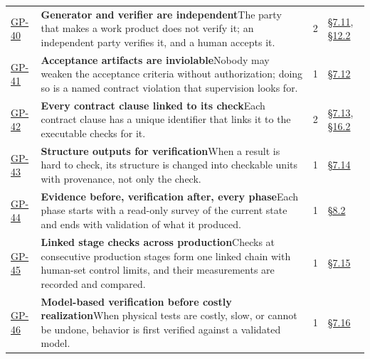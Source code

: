 \begin{longtable}{@{}p{} p{} r p{}@{}}
\hyperlink{gp-40}{GP-40}\hypertarget{gp-40}{} & \textbf{Generator and verifier are independent}\newline The party that makes a work product does not verify it; an independent party verifies it, and a human accepts it.\rule[-\normalbaselineskip]{0pt}{0pt} & 2 & \hyperlink{nss-7.11}{\S7.11}, \hyperlink{nss-12.2}{\S12.2}\rule[-\normalbaselineskip]{0pt}{0pt} \\
\hyperlink{gp-41}{GP-41}\hypertarget{gp-41}{} & \textbf{Acceptance artifacts are inviolable}\newline Nobody may weaken the acceptance criteria without authorization; doing so is a named contract violation that supervision looks for.\rule[-\normalbaselineskip]{0pt}{0pt} & 1 & \hyperlink{nss-7.12}{\S7.12}\rule[-\normalbaselineskip]{0pt}{0pt} \\
\hyperlink{gp-42}{GP-42}\hypertarget{gp-42}{} & \textbf{Every contract clause linked to its check}\newline Each contract clause has a unique identifier that links it to the executable checks for it.\rule[-\normalbaselineskip]{0pt}{0pt} & 2 & \hyperlink{nss-7.13}{\S7.13}, \hyperlink{nss-16.2}{\S16.2}\rule[-\normalbaselineskip]{0pt}{0pt} \\
\hyperlink{gp-43}{GP-43}\hypertarget{gp-43}{} & \textbf{Structure outputs for verification}\newline When a result is hard to check, its structure is changed into checkable units with provenance, not only the check.\rule[-\normalbaselineskip]{0pt}{0pt} & 1 & \hyperlink{nss-7.14}{\S7.14}\rule[-\normalbaselineskip]{0pt}{0pt} \\
\hyperlink{gp-44}{GP-44}\hypertarget{gp-44}{} & \textbf{Evidence before, verification after, every phase}\newline Each phase starts with a read-only survey of the current state and ends with validation of what it produced.\rule[-\normalbaselineskip]{0pt}{0pt} & 1 & \hyperlink{nss-8.2}{\S8.2}\rule[-\normalbaselineskip]{0pt}{0pt} \\
\hyperlink{gp-45}{GP-45}\hypertarget{gp-45}{} & \textbf{Linked stage checks across production}\newline Checks at consecutive production stages form one linked chain with human-set control limits, and their measurements are recorded and compared.\rule[-\normalbaselineskip]{0pt}{0pt} & 1 & \hyperlink{nss-7.15}{\S7.15}\rule[-\normalbaselineskip]{0pt}{0pt} \\
\hyperlink{gp-46}{GP-46}\hypertarget{gp-46}{} & \textbf{Model-based verification before costly realization}\newline When physical tests are costly, slow, or cannot be undone, behavior is first verified against a validated model.\rule[-\normalbaselineskip]{0pt}{0pt} & 1 & \hyperlink{nss-7.16}{\S7.16}\rule[-\normalbaselineskip]{0pt}{0pt} \\

\end{longtable}
